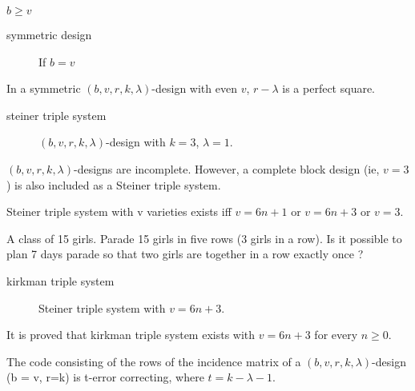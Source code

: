 \begin{theorem}
	$ b \ge v$
\end{theorem}

\begin{description}
	\item[symmetric design] If $b = v$
\end{description}

\begin{theorem}
	In a symmetric $(b,v,r,k,\lambda)$-design with even $v$, $r-\lambda$ is a perfect square.
\end{theorem}

\begin{description}
	\item[steiner triple system] $(b,v,r,k,\lambda)$-design with $k=3$, $\lambda=1$.
\end{description}

\begin{remark}
	$(b,v,r,k,\lambda)$-designs are incomplete.
	However, a complete block design (ie, $v = 3$) is also included as a Steiner triple system.
\end{remark}

\begin{theorem}
	Steiner triple system with v varieties exists iff $v = 6n+1$ or $v= 6n+3$ or $v = 3$.
\end{theorem}

\begin{definition}
	A class of 15 girls.
	Parade 15 girls in five rows (3 girls in a row).
	Is it possible to plan 7 days parade so that two girls are together in a row exactly once ?
\end{definition}

\begin{description}
	\item[kirkman triple system] Steiner triple system with $v = 6n+3$. 
\end{description}

\begin{remark}
	It is proved that kirkman triple system exists with $v = 6n+3$ for every $n \ge 0$.
\end{remark}

\begin{theorem}
	The code consisting of the rows of the incidence matrix of a $(b,v,r,k,\lambda)$-design (b = v, r=k) is t-error correcting, where $t = k-\lambda-1$.
\end{theorem}

